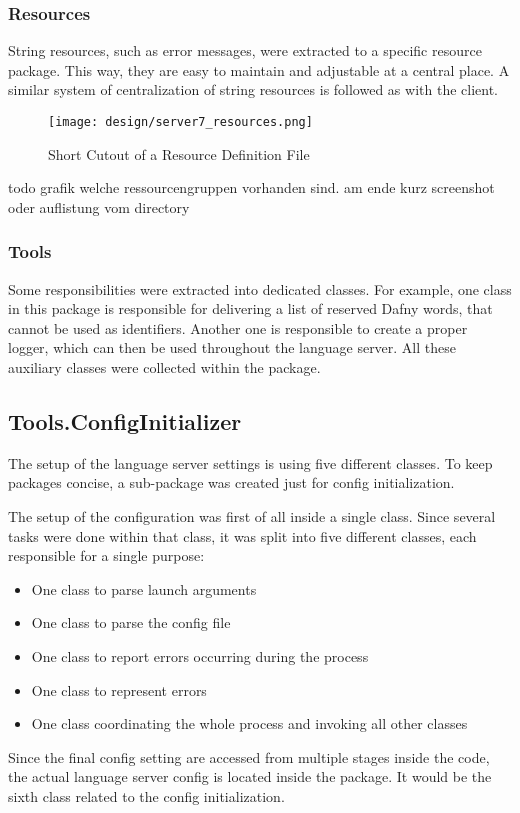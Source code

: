 \subsubsection{Resources}
String resources, such as error messages, were extracted to a specific resource package.
This way, they are easy to maintain and adjustable at a central place.
A similar system of centralization of string resources is followed as with the client.

\begin{figure}[H]
    \centering
    \texttt{[image: design/server7\_resources.png]}
    \caption{Short Cutout of a Resource Definition File}
    \label{fig:server_resources}
\end{figure}

todo grafik welche ressourcengruppen vorhanden sind. am ende kurz screenshot oder auflistung vom directory

\subsubsection{Tools}
Some responsibilities were extracted into dedicated classes.
For example, one class in this package is responsible for delivering a list of reserved Dafny words, that cannot be used as identifiers.
Another one is responsible to create a proper logger, which can then be used throughout the language server.
All these auxiliary classes were collected within the  package.\\

\subsection{Tools.ConfigInitializer}
The setup of the language server settings is using five different classes.
To keep packages concise, a sub-package was created just for config initialization.

The setup of the configuration was first of all inside a single class.
Since several tasks were done within that class, it was split into five different classes, each responsible for a single purpose:
\begin{itemize}
    \item One class to parse launch arguments
    \item One class to parse the config file
    \item One class to report errors occurring during the process
    \item One class to represent errors
    \item One class coordinating the whole process and invoking all other classes
\end{itemize}
Since the final config setting are accessed from multiple stages inside the code, the actual language server config is located inside the  package.
It would be the sixth class related to the config initialization.

